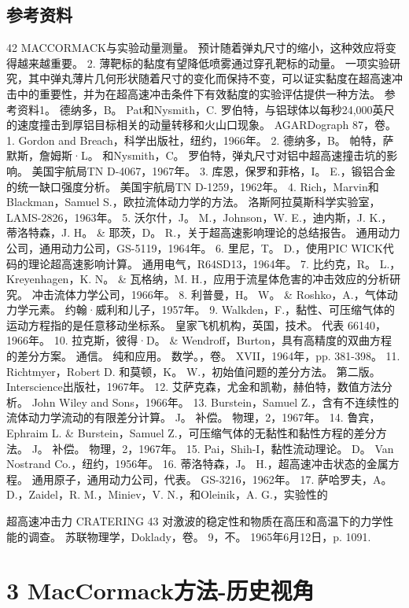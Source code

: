 \documentclass[UTF8,11pt,a4paper,openany,fontset=fandol]{ctexbook}
\begin{document}
\section{参考资料}
42 MACCORMACK与实验动量测量。 预计随着弹丸尺寸的缩小，这种效应将变得越来越重要。 2. 薄靶标的黏度有望降低喷雾通过穿孔靶标的动量。 一项实验研究，其中弹丸薄片几何形状随着尺寸的变化而保持不变，可以证实黏度在超高速冲击中的重要性，并为在超高速冲击条件下有效黏度的实验评估提供一种方法。 参考资料1。 德纳多，B。 Pat和Nysmith，C. 罗伯特，与铝球体以每秒24,000英尺的速度撞击到厚铝目标相关的动量转移和火山口现象。 AGARDograph 87，卷。 1. Gordon and Breach，科学出版社，纽约，1966年。 2. 德纳多，B。 帕特，萨默斯，詹姆斯·L。 和Nysmith，C。 罗伯特，弹丸尺寸对铝中超高速撞击坑的影响。 美国宇航局TN D-4067，1967年。 3. 库恩，保罗和菲格，I。 E.，锻铝合金的统一缺口强度分析。 美国宇航局TN D-1259，1962年。 4. Rich，Marvin和Blackman，Samuel S.，欧拉流体动力学的方法。 洛斯阿拉莫斯科学实验室，LAMS-2826，1963年。 5. 沃尔什，J。 M.，Johnson，W. E.，迪内斯，J. K.，蒂洛特森，J. H。 \& 耶茨，D。 R.，关于超高速影响理论的总结报告。 通用动力公司，通用动力公司，GS-5119，1964年。 6. 里尼，T。 D.，使用PIC WICK代码的理论超高速影响计算。 通用电气，R64SD13，1964年。 7. 比约克，R。 L.，Kreyenhagen，K. N。 \& 瓦格纳，M. H.，应用于流星体危害的冲击效应的分析研究。 冲击流体力学公司，1966年。 8. 利普曼，H。 W。 \& Roshko，A.，气体动力学元素。 约翰·威利和儿子，1957年。 9. Walkden，F.，黏性、可压缩气体的运动方程指的是任意移动坐标系。 皇家飞机机构，英国，技术。 代表 66140，1966年。 10. 拉克斯，彼得·D。 \& Wendroff，Burton，具有高精度的双曲方程的差分方案。 通信。 纯和应用。 数学。，卷。 XVII，1964年，pp. 381-398。 11. Richtmyer，Robert D. 和莫顿，K。 W.，初始值问题的差分方法。 第二版。 Interscience出版社，1967年。 12. 艾萨克森，尤金和凯勒，赫伯特，数值方法分析。 John Wiley and Sons，1966年。 13. Burstein，Samuel Z.，含有不连续性的流体动力学流动的有限差分计算。 J。 补偿。 物理，2，1967年。 14. 鲁宾，Ephraim L. \& Burstein，Samuel Z.，可压缩气体的无黏性和黏性方程的差分方法。 J。 补偿。 物理，2，1967年。 15. Pai，Shih-I，黏性流动理论。 D。 Van Nostrand Co.，纽约，1956年。 16. 蒂洛特森，J。 H.，超高速冲击状态的金属方程。 通用原子，通用动力公司，代表。 GS-3216，1962年。 17. 萨哈罗夫，A。 D.，Zaidel，R. M.，Miniev，V. N.，和Oleinik，A. G.，实验性的

超高速冲击力 CRATERING 43 对激波的稳定性和物质在高压和高温下的力学性能的调查。 苏联物理学，Doklady，卷。 9，不。 1965年6月12日，p. 1091.

\clearpage
\chapter{3 MacCormack方法-历史视角}
\end{document}
